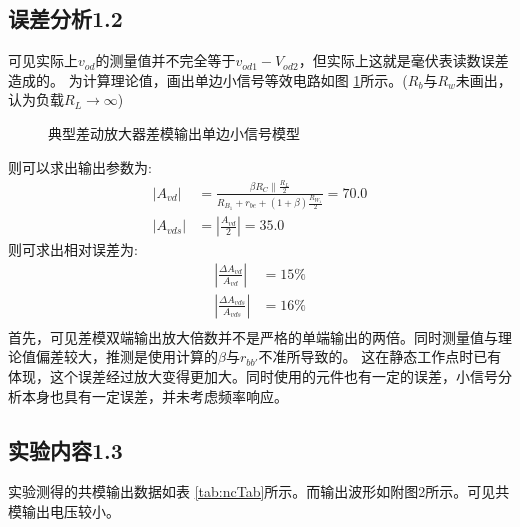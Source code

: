 \documentclass[a4paper,11pt,UTF8]{ctexart}
\begin{document}
\subsection{误差分析1.2}
可见实际上$v_{od}$的测量值并不完全等于$v_{od1}-V_{od2}$，但实际上这就是毫伏表读数误差造成的。
为计算理论值，画出单边小信号等效电路如图 \ref{fig:ndSmallSignal}所示。($R_b$与$R_w$未画出，认为负载$R_L\rightarrow\infty$)
\begin{figure}[htbp]
  \centering
  \caption{典型差动放大器差模输出单边小信号模型}
  \label{fig:ndSmallSignal}
  \end{figure}
则可以求出输出参数为:
\begin{equation}
  \begin{aligned}
    \left | A_{vd}\right |&=\frac{\beta R_C\parallel\frac{R_L}{2}}{R_{B_1}+r_{be}+(1+\beta)\frac{R_{W_1}}{2}}=70.0\\
    \left | A_{vds}\right |&=\left |\frac{A_{vd}}{2}\right |=35.0
  \end{aligned}
\end{equation}
则可求出相对误差为:
\begin{equation}
  \begin{aligned}
    \left |\frac{\Delta A_{vd}}{A_{vd}}\right |&=15\%\\
      \left |\frac{\Delta A_{vds}}{A_{vds}}\right |&=16\%\\
  \end{aligned}
\end{equation}
首先，可见差模双端输出放大倍数并不是严格的单端输出的两倍。同时测量值与理论值偏差较大，推测是使用计算的$\beta$与$r_{bb'}$不准所导致的。
这在静态工作点时已有体现，这个误差经过放大变得更加大。同时使用的元件也有一定的误差，小信号分析本身也具有一定误差，并未考虑频率响应。
\subsection{实验内容1.3}
实验测得的共模输出数据如表 \ref{tab:ncTab}所示。而输出波形如附图2所示。可见共模输出电压较小。
\end{document}
